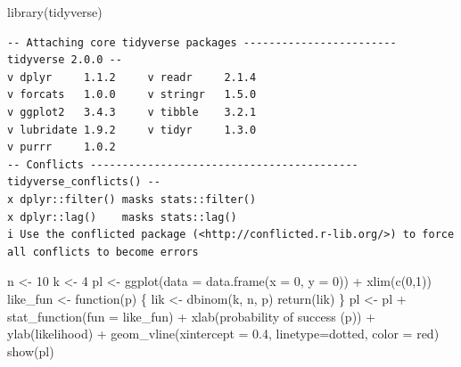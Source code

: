\documentclass[
  letterpaper,
  DIV=11,
  numbers=noendperiod]{scrreprt}
\newenvironment{Shaded}{\begin{snugshade}}{\end{snugshade}}
\newcommand{\AttributeTok}[1]{\textcolor[rgb]{0.40,0.45,0.13}{#1}}
\newcommand{\ControlFlowTok}[1]{\textcolor[rgb]{0.00,0.23,0.31}{#1}}
\newcommand{\DecValTok}[1]{\textcolor[rgb]{0.68,0.00,0.00}{#1}}
\newcommand{\FloatTok}[1]{\textcolor[rgb]{0.68,0.00,0.00}{#1}}
\newcommand{\FunctionTok}[1]{\textcolor[rgb]{0.28,0.35,0.67}{#1}}
\newcommand{\NormalTok}[1]{\textcolor[rgb]{0.00,0.23,0.31}{#1}}
\newcommand{\OtherTok}[1]{\textcolor[rgb]{0.00,0.23,0.31}{#1}}
\newcommand{\SpecialCharTok}[1]{\textcolor[rgb]{0.37,0.37,0.37}{#1}}
\newcommand{\StringTok}[1]{\textcolor[rgb]{0.13,0.47,0.30}{#1}}
\begin{document}
\begin{Shaded}
\begin{Highlighting}[]
\FunctionTok{library}\NormalTok{(tidyverse)}
\end{Highlighting}
\end{Shaded}

\begin{verbatim}
-- Attaching core tidyverse packages ------------------------ tidyverse 2.0.0 --
v dplyr     1.1.2     v readr     2.1.4
v forcats   1.0.0     v stringr   1.5.0
v ggplot2   3.4.3     v tibble    3.2.1
v lubridate 1.9.2     v tidyr     1.3.0
v purrr     1.0.2     
-- Conflicts ------------------------------------------ tidyverse_conflicts() --
x dplyr::filter() masks stats::filter()
x dplyr::lag()    masks stats::lag()
i Use the conflicted package (<http://conflicted.r-lib.org/>) to force all conflicts to become errors
\end{verbatim}

\begin{Shaded}
\begin{Highlighting}[]
\NormalTok{n }\OtherTok{\textless{}{-}} \DecValTok{10}
\NormalTok{k }\OtherTok{\textless{}{-}} \DecValTok{4}
\NormalTok{pl }\OtherTok{\textless{}{-}} \FunctionTok{ggplot}\NormalTok{(}\AttributeTok{data =} \FunctionTok{data.frame}\NormalTok{(}\AttributeTok{x =} \DecValTok{0}\NormalTok{, }\AttributeTok{y =} \DecValTok{0}\NormalTok{)) }\SpecialCharTok{+} \FunctionTok{xlim}\NormalTok{(}\FunctionTok{c}\NormalTok{(}\DecValTok{0}\NormalTok{,}\DecValTok{1}\NormalTok{))}
\NormalTok{like\_fun }\OtherTok{\textless{}{-}} \ControlFlowTok{function}\NormalTok{(p) \{}
\NormalTok{  lik }\OtherTok{\textless{}{-}} \FunctionTok{dbinom}\NormalTok{(k, n, p)}
  \FunctionTok{return}\NormalTok{(lik)}
\NormalTok{\}}
\NormalTok{pl }\OtherTok{\textless{}{-}}\NormalTok{ pl }\SpecialCharTok{+} \FunctionTok{stat\_function}\NormalTok{(}\AttributeTok{fun =}\NormalTok{ like\_fun) }\SpecialCharTok{+} 
  \FunctionTok{xlab}\NormalTok{(}\StringTok{\textquotesingle{}probability of success (p)\textquotesingle{}}\NormalTok{) }\SpecialCharTok{+} 
  \FunctionTok{ylab}\NormalTok{(}\StringTok{\textquotesingle{}likelihood\textquotesingle{}}\NormalTok{) }\SpecialCharTok{+}
  \FunctionTok{geom\_vline}\NormalTok{(}\AttributeTok{xintercept =} \FloatTok{0.4}\NormalTok{, }\AttributeTok{linetype=}\StringTok{\textquotesingle{}dotted\textquotesingle{}}\NormalTok{, }\AttributeTok{color =} \StringTok{\textquotesingle{}red\textquotesingle{}}\NormalTok{)}
\FunctionTok{show}\NormalTok{(pl)}
\end{Highlighting}
\end{Shaded}
\end{document}
